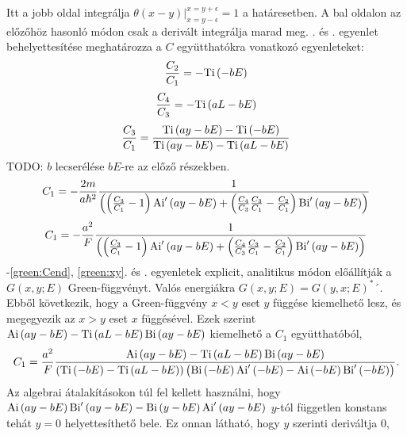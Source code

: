 Itt a jobb oldal integrálja $\left. \theta\left(x - y\right) \right\rvert_{x = y - \epsilon}^{x = y + \epsilon} = 1$ a határesetben. A bal oldalon az előzőhöz hasonló módon csak a derivált integrálja marad meg. . és . egyenlet behelyettesítése meghatározza a $C$ együtthatókra vonatkozó egyenleteket:
\begin{equation}
	\frac{C_2}{C_1} = -\mathrm{Ti}\left(-bE\right)
	\label{green:Cbegin}
\end{equation}
\begin{equation}
	\frac{C_4}{C_3} = -\mathrm{Ti}\left(aL - bE\right)
\end{equation}
\begin{equation}
	\frac{C_3}{C_1} = \frac{\mathrm{Ti}\left(ay - bE\right) - \mathrm{Ti}\left(-bE\right)}{\mathrm{Ti}\left(ay - bE\right) - \mathrm{Ti}\left(aL - bE\right)}
\end{equation}
TODO: $b$ lecserélése $bE$-re az előző részekben.
\begin{equation}
	C_1 = -\frac{2m}{a\hbar^2}\frac{1}{\left( \left(\frac{C_3}{C_1}-1\right)\mathrm{Ai}^\prime\left(ay - bE\right) + \left(\frac{C_4}{C_3}\frac{C_3}{C_1} - \frac{C_2}{C_1}\right) \mathrm{Bi}^\prime\left(ay - bE\right) \right)}
	\label{green:Cend}
\end{equation}
\begin{equation}
	C_1 = -\frac{a^2}{F}\frac{1}{\left( \left(\frac{C_3}{C_1}-1\right)\mathrm{Ai}^\prime\left(ay - bE\right) + \left(\frac{C_4}{C_3}\frac{C_3}{C_1} - \frac{C_2}{C_1}\right) \mathrm{Bi}^\prime\left(ay - bE\right) \right)}
\end{equation}
-\ref{green:Cend}, \ref{green:xy}. és . egyenletek explicit, analitikus módon előállítják a $G\left( x, y; E \right)$ Green-függvényt. Valós energiákra $G\left(x, y; E\right) = G\left(y, x; E\right)^*´$. Ebből következik, hogy a Green-függvény $x<y$ eset $y$ függése kiemelhető lesz, és megegyezik az $x>y$ eset $x$ függésével. Ezek szerint $\mathrm{Ai}\left(ay-bE\right)-\mathrm{Ti}\left(aL-bE\right)\mathrm{Bi}\left(ay-bE\right)$ kiemelhető a $C_1$ együtthatóból,
\begin{equation}
	C_1 = \frac{a^2}{F}\frac{\mathrm{Ai}\left(ay-bE\right)-\mathrm{Ti}\left(aL-bE\right)\mathrm{Bi}\left(ay-bE\right)}{\left(\mathrm{Ti}\left(-bE\right)-\mathrm{Ti}\left(aL-bE\right)\right)\left(\mathrm{Bi}\left(-bE\right)\mathrm{Ai}^\prime\left(-bE\right)-\mathrm{Ai}\left(-bE\right)\mathrm{Bi}^\prime\left(-bE\right)\right)}.
\end{equation}
Az algebrai átalakításokon túl fel kellett használni, hogy $\mathrm{Ai}\left(ay-bE\right)\mathrm{Bi}^\prime\left(ay-bE\right)-\mathrm{Bi}\left(y-bE\right)\mathrm{Ai}^\prime\left(ay-bE\right)$ $y$-tól független konstans tehát $y=0$ helyettesíthető bele. Ez onnan látható, hogy $y$ szerinti deriváltja $0$,
